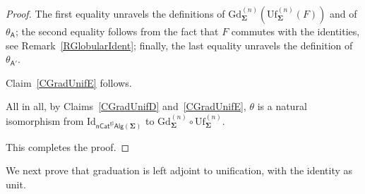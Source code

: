 \documentclass[a4paper, reqno
]{amsart}
\newcommand{\sig}[1]{\mathbf{#1}}             %
\newcommand{\calg}[1]{\boldsymbol{\mathsf{#1}}} %
\newcommand{\Id}{\mathrm{Id}}
\newcommand{\gl}{\mathrm{gl}}                %
\newcommand{\Gd}{\mathrm{Gd}}
\newcommand{\Uf}{\mathrm{Uf}}
\theoremstyle{plain}
\theoremstyle{definition}
\begin{document}
\begin{proof}
The first equality unravels the definitions of $\Gd^{(n)}_{\sig{\Sigma}}(\Uf^{(n)}_{\sig{\Sigma}}(F))$ and of $\theta_{\calg{A}}$; the second equality follows from the fact that $F$ commutes with the identities, see Remark~\ref{RGlobularIdent}; finally, the last equality unravels the definition of $\theta_{\calg{A}'}$.

Claim~\ref{CGradUnifE} follows.

All in all, by Claims~\ref{CGradUnifD} and~\ref{CGradUnifE}, $\theta$ is a natural isomorphism from $\Id_{\mathsf{nCat}^{\gl}\mathsf{Alg}(\sig{\Sigma})}$ to $\Gd^{(n)}_{\sig{\Sigma}}\circ\Uf^{(n)}_{\sig{\Sigma}}$.

This completes the proof.
\end{proof}

We next prove that graduation is left adjoint to unification, with the identity as unit.
\end{document}
